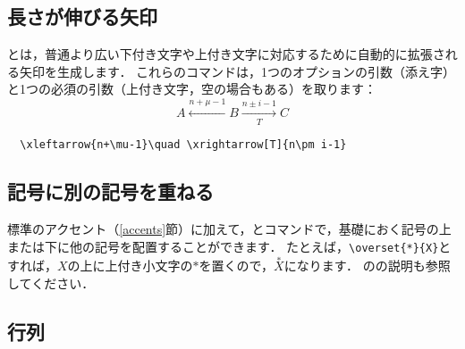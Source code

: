 \subsection{長さが伸びる矢印}

とは，普通より広い下付き文字や上付き文字に対応するために自動的に拡張される矢印を生成します．
これらのコマンドは，1つのオプションの引数（添え字）と1つの必須の引数（上付き文字，空の場合もある）を取ります：
\begin{equation}
A\xleftarrow{n+\mu-1}B \xrightarrow[T]{n\pm i-1}C
\end{equation}
\begin{verbatim}
  \xleftarrow{n+\mu-1}\quad \xrightarrow[T]{n\pm i-1}
\end{verbatim}

\subsection{記号に別の記号を重ねる}

標準のアクセント（\ref{accents}節）に加えて，とコマンドで，基礎におく記号の上または下に他の記号を配置することができます．
たとえば，\verb|\overset{*}{X}|とすれば，$X$の上に上付き小文字の$*$を置くので，$\overset{*}{X}$になります．
のの説明も参照してください．

\subsection{行列}\label{ss:matrix}


